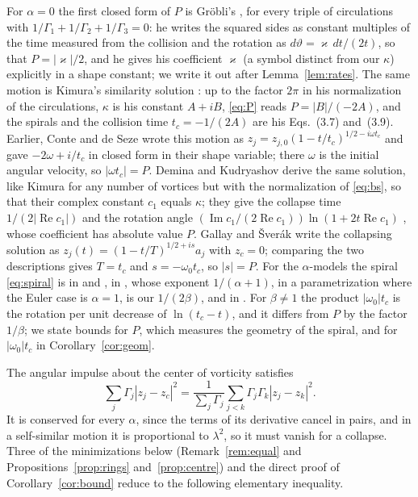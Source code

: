 \documentclass[11pt]{article}
\theoremstyle{definition}
\newcommand{\re}{\operatorname{Re}}
\newcommand{\im}{\operatorname{Im}}
\begin{document}
For $\alpha = 0$ the first closed form of $P$ is Gr\"obli's \cite[\S~10, Eqs.~(8), (9), (12), pp.~56--57]{grobli1877}, for every triple of circulations with $1/\Gamma_1 + 1/\Gamma_2 + 1/\Gamma_3 = 0$: he writes the squared sides as constant multiples of the time measured from the collision and the rotation as $d\vartheta = \varkappa\,dt/(2t)$, so that $P = |\varkappa|/2$, and he gives his coefficient $\varkappa$ (a symbol distinct from our $\kappa$) explicitly in a shape constant; we write it out after Lemma~\ref{lem:rates}. The same motion is Kimura's similarity solution \cite[Sect.~3.1]{kimura1987}: up to the factor $2\pi$ in his normalization of the circulations, $\kappa$ is his constant $A + iB$, \eqref{eq:P} reads $P = |B|/(-2A)$, and the spirals and the collision time $t_c = -1/(2A)$ are his Eqs.~(3.7) and~(3.9). Earlier, Conte and de Seze \cite[Sect.~4, pp.~24--25]{cds1980} wrote this motion as $z_j = z_{j,0} (1 - t/t_c)^{1/2 - i\omega t_c}$ and gave $-2\omega + i/t_c$ in closed form in their shape variable; there $\omega$ is the initial angular velocity, so $|\omega t_c| = P$. Demina and Kudryashov \cite[Eqs.~(7)--(12)]{dk2014} derive the same solution, like Kimura for any number of vortices but with the normalization of \eqref{eq:bs}, so that their complex constant $c_1$ equals $\kappa$; they give the collapse time $1/(2|\re c_1|)$ \cite[Eq.~(12)]{dk2014} and the rotation angle $(\im c_1/(2\re c_1))\ln(1 + 2t\re c_1)$ \cite[Eq.~(10)]{dk2014}, whose coefficient has absolute value $P$. Gallay and \v{S}ver\'ak \cite[Prop.~5.2, Eqs.~(5.5), (5.11)]{gallay2026} write the collapsing solution as $z_j(t) = (1 - t/T)^{1/2 + is} a_j$ with $z_c = 0$; comparing the two descriptions gives $T = t_c$ and $s = -\omega_0 t_c$, so $|s| = P$. For the $\alpha$-models the spiral \eqref{eq:spiral} is in \cite[Eqs.~(31), (32), (A.9)]{yoi2021} and \cite[Eqs.~(3)--(6)]{iy2023}, in \cite[App.~A, Eq.~(A.19)]{dgc2023}, whose exponent $1/(\alpha + 1)$, in a parametrization where the Euler case is $\alpha = 1$, is our $1/(2\beta)$, and in \cite[Prop.~2.1]{gp2025}. For $\beta \ne 1$ the product $|\omega_0| t_c$ is the rotation per unit decrease of $\ln(t_c - t)$, and it differs from $P$ by the factor $1/\beta$; we state bounds for $P$, which measures the geometry of the spiral, and for $|\omega_0| t_c$ in Corollary~\ref{cor:geom}.

The angular impulse about the center of vorticity satisfies
\begin{equation}\label{eq:L}
  \sum_j \Gamma_j |z_j - z_c|^2 = \frac{1}{\sum_j \Gamma_j} \sum_{j < k} \Gamma_j \Gamma_k |z_j - z_k|^2.
\end{equation}
It is conserved for every $\alpha$, since the terms of its derivative cancel in pairs, and in a self-similar motion it is proportional to $\lambda^2$, so it must vanish for a collapse. Three of the minimizations below (Remark~\ref{rem:equal} and Propositions~\ref{prop:rings} and~\ref{prop:centre}) and the direct proof of Corollary~\ref{cor:bound} reduce to the following elementary inequality.
\end{document}

